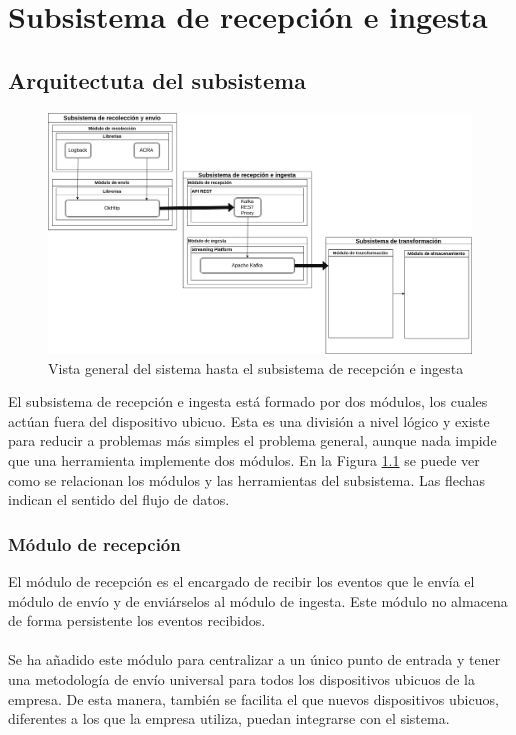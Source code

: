 \chapter{Subsistema de recepción e ingesta}

\section{Arquitectuta del subsistema}

\begin{figure}[!htb]
	\includegraphics[width=\linewidth]{Moduloss-subrecing.png}
	\caption{Vista general del sistema hasta el subsistema de recepción e ingesta}
	\label{fig:subrecing}
\end{figure}

El subsistema de recepción e ingesta está formado por dos módulos, los cuales actúan fuera del dispositivo ubicuo. Esta es una división a nivel lógico y existe para reducir a problemas más simples el problema general, aunque nada impide que una herramienta implemente dos módulos. En la Figura \ref{fig:subrecing} se puede ver como se relacionan los módulos y las herramientas del subsistema. Las flechas indican el sentido del flujo de datos.

\subsection{Módulo de recepción}

El módulo de recepción es el encargado de recibir los eventos que le envía el módulo de envío y de enviárselos al módulo de ingesta. Este módulo no almacena de forma persistente los eventos recibidos.
\\\\
Se ha añadido este módulo para centralizar a un único punto de entrada y tener una metodología de envío universal para todos los dispositivos ubicuos de la empresa. De esta manera, también se facilita el que nuevos dispositivos ubicuos, diferentes a los que la empresa utiliza, puedan integrarse con el sistema.

